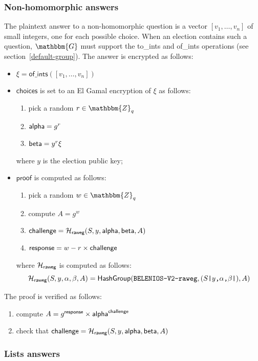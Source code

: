 \documentclass[a4paper]{article}
\newcommand{\dstprefix}{BELENIOS-V2}
\newcommand{\G}{\mathbbm{G}}
\newcommand{\Z}{\mathbbm{Z}}
\begin{document}
\subsubsection{Non-homomorphic answers}
\label{nh-answers}

The plaintext answer to a non-homomorphic question is a vector
$[v_1,\dots,v_n]$ of small integers, one for each possible
choice. When an election contains such a question, $\G$ must support
the \textsf{to\_ints} and \textsf{of\_ints} operations (see
section~\ref{default-group}). The answer is encrypted as follows:
\begin{itemize}
\item $\xi=\textsf{of\_ints}([v_1,\dots,v_n])$
\item $\textsf{choices}$ is set to an El Gamal encryption of $\xi$ as
  follows:
  \begin{enumerate}
  \item pick a random $r\in\Z_q$
  \item $\textsf{alpha}=g^r$
  \item $\textsf{beta}=y^r\xi$
  \end{enumerate}
  where $y$ is the election public key;
\item $\textsf{proof}$ is computed as follows:
  \begin{enumerate}
  \item pick a random $w\in\Z_q$
  \item compute $A=g^w$
  \item $\textsf{challenge}=\mathcal{H}_{\textsf{raweg}}(S,y,\textsf{alpha},\textsf{beta},A)$
  \item $\textsf{response}=w-r\times\textsf{challenge}$
  \end{enumerate}
  where $\mathcal{H}_{\textsf{raweg}}$ is computed as follows:
  \[
    \Hash_{\textsf{raweg}}(S,y,\alpha,\beta,A)=\textsf{HashGroup}(\texttt{\dstprefix-raweg},(S\verb=|=y\verb=,=\alpha\verb=,=\beta\verb=|=),A)
  \]
\end{itemize}
The proof is verified as follows:
\begin{enumerate}
\item compute $A=g^{\textsf{response}}\times\textsf{alpha}^{\textsf{challenge}}$
\item check that $\textsf{challenge}=\mathcal{H}_{\textsf{raweg}}(S,y,\textsf{alpha},\textsf{beta},A)$
\end{enumerate}

\subsubsection{Lists answers}
\label{l-answers}
\end{document}
